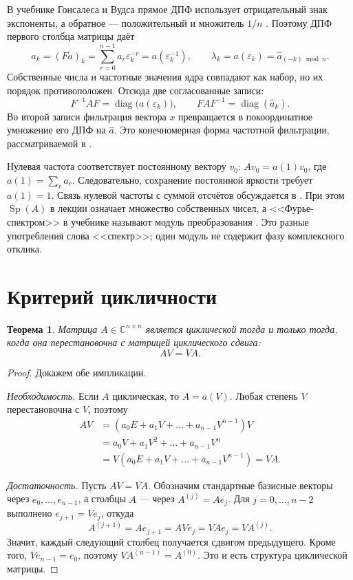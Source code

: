 \documentclass[12pt,a4paper]{article}
\newtheorem{theorem}{Теорема}
\theoremstyle{definition}
\theoremstyle{remark}
\DeclareMathOperator{\Sp}{Sp}
\DeclareMathOperator{\diag}{diag}
\newcommand{\CC}{\mathbb{C}}
\newcommand{\eps}{\varepsilon}
\begin{document}
В учебнике Гонсалеса и Вудса прямое ДПФ использует отрицательный
знак экспоненты, а обратное --- положительный и множитель $1/n$
\cite[\S\,4.4.1, с.~269]{GW2012}.
Поэтому ДПФ первого столбца матрицы даёт
\[
  \widehat a_k=(Fa)_k=\sum_{r=0}^{n-1}a_r\eps_k^{-r}
  =a(\eps_k^{-1}),\qquad
  \lambda_k=a(\eps_k)=\widehat a_{(-k)\bmod n}.
\]
Собственные числа и частотные значения ядра совпадают как набор,
но их порядок противоположен. Отсюда две согласованные записи:
\[
  F^{-1}AF=\diag\bigl(a(\eps_k)\bigr),\qquad
  FAF^{-1}=\diag(\widehat a_k).
\]
Во второй записи фильтрация вектора $x$ превращается
в покоординатное умножение его ДПФ на $\widehat a$.
Это конечномерная форма частотной фильтрации, рассматриваемой
в \cite[\S\,4.6.6, с.~298]{GW2012}.

Нулевая частота соответствует постоянному вектору $v_0$:
$Av_0=a(1)v_0$, где $a(1)=\sum_r a_r$.
Следовательно, сохранение постоянной яркости требует $a(1)=1$.
Связь нулевой частоты с суммой отсчётов обсуждается
в \cite[\S\,4.6.5, с.~294]{GW2012}.
При этом $\Sp(A)$ в лекции означает множество собственных чисел,
а <<Фурье-спектром>> в учебнике называют модуль преобразования
\cite[\S\,4.6.5, с.~293]{GW2012}. Это разные употребления слова
<<спектр>>; один модуль не содержит фазу комплексного отклика.

\section{Критерий цикличности}

\begin{theorem}
Матрица $A\in\CC^{n\times n}$ является циклической тогда и только тогда,
когда она перестановочна с матрицей циклического сдвига:
\[
  \boxed{AV=VA}.
\]
\end{theorem}

\begin{proof}
Докажем обе импликации.

\smallskip
\noindent
\emph{Необходимость.} Если $A$ циклическая, то $A=a(V)$. Любая степень
$V$ перестановочна с $V$, поэтому
\begin{align*}
  AV&=(a_0E+a_1V+\dots+a_{n-1}V^{n-1})V\\
    &=a_0V+a_1V^2+\dots+a_{n-1}V^n\\
    &=V(a_0E+a_1V+\dots+a_{n-1}V^{n-1})=VA.
\end{align*}

\smallskip
\noindent
\emph{Достаточность.} Пусть $AV=VA$. Обозначим стандартные базисные
векторы через $e_0,\dots,e_{n-1}$, а столбцы $A$ --- через
$A^{(j)}=Ae_j$. Для $j=0,\dots,n-2$ выполнено $e_{j+1}=Ve_j$, откуда
\[
  A^{(j+1)}=Ae_{j+1}=AVe_j=VAe_j=VA^{(j)}.
\]
Значит, каждый следующий столбец получается сдвигом предыдущего.
Кроме того, $Ve_{n-1}=e_0$, поэтому $VA^{(n-1)}=A^{(0)}$.
Это и есть структура циклической матрицы.
\end{proof}
\end{document}
